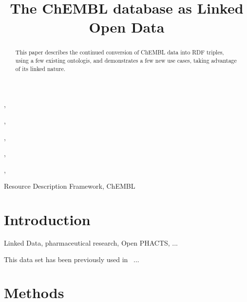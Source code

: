 \documentclass[sw]{iosart2c}
\begin{document}
\begin{frontmatter}

\title{The ChEMBL database as Linked Open Data}



\author[A]{ } %
\address[A]{Maastricht University}

\author[B]{ },
\address[B]{Uppsala University}

\author[C]{ },
\address[C]{xxx}

\author[D]{ },
\address[D]{xxx}

\author[E]{ },
\author[E]{ },
\address[E]{European Bioinformatics Institute}


\begin{abstract}
This paper describes the continued conversion of ChEMBL data into RDF triples, using a few existing
ontologis, and demonstrates a few new use cases, taking advantage of its linked nature.
\end{abstract}

\begin{keyword}
Resource Description Framework, ChEMBL
\end{keyword}

\end{frontmatter}


\section{Introduction}\label{s1}

Linked Data, pharmaceutical research, Open PHACTS, ...

This data set has been previously used in~\cite{Willighagen2011} ...


\section{Methods}\label{s2}
\end{document}
